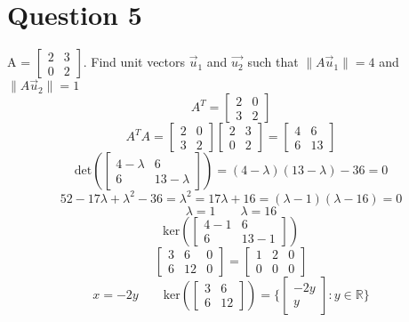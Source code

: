 \documentclass[hidelinks]{article}
\begin{document}
\section{Question 5}
A = $\begin{bmatrix} 2 & 3 \\ 0 & 2 \end{bmatrix}$. Find unit vectors $\vec{u}_1$ and $\vec{u_2}$ such that $\| A\vec{u}_1\| = 4$ and $\| A\vec{u}_2\| = 1$
\[
	A^T = \begin{bmatrix} 2 & 0 \\ 3 & 2 \end{bmatrix}
\]
\[
	A^TA = \begin{bmatrix} 2 & 0 \\ 3 & 2 \end{bmatrix} \begin{bmatrix} 2 & 3 \\ 0 & 2 \end{bmatrix} = \begin{bmatrix} 4 & 6 \\ 6 & 13 \end{bmatrix} 
\]
\[
	\text{det}(\begin{bmatrix} 4 - \lambda & 6 \\ 6 & 13 - \lambda \end{bmatrix}) = (4-\lambda)(13-\lambda) - 36 = 0
\]
\[
	52 - 17\lambda + \lambda^2 - 36 = \lambda^2 = 17\lambda + 16 = (\lambda - 1)(\lambda - 16) = 0
\]
\[
	\lambda = 1 \quad \quad \lambda = 16
\]
\[
	\text{ker}(\begin{bmatrix} 4 - 1 & 6 \\ 6 & 13 - 1 \end{bmatrix}) 
\]
\[
	\begin{bmatrix} 3 & 6 & 0 \\ 6 & 12 & 0 \end{bmatrix} = \begin{bmatrix} 1 & 2 & 0 \\ 0 & 0 & 0 \end{bmatrix} 
\]
\[
	x = -2y \quad \quad \text{ker}(\begin{bmatrix} 3 & 6 \\ 6 & 12 \end{bmatrix}) = \{\begin{bmatrix} -2y \\ y \end{bmatrix} : y \in \mathbb{R}\} 
\]
\end{document}
